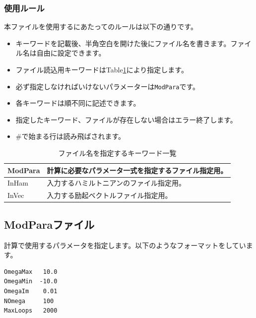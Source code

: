 \documentclass[12pt,titlepage]{jarticle}
\begin{document}
\subsubsection{使用ルール}
本ファイルを使用するにあたってのルールは以下の通りです。
\begin{itemize}
\item キーワードを記載後、半角空白を開けた後にファイル名を書きます。ファイル名は自由に設定できます。
\item ファイル読込用キーワードはTable\ref{Table:Defs}により指定します。
\item 必ず指定しなければいけないパラメーターは\verb|ModPara|です。
\item 各キーワードは順不同に記述できます。
\item 指定したキーワード、ファイルが存在しない場合はエラー終了します。
\item $\#$で始まる行は読み飛ばされます。
\end{itemize}

 \begin{table}[h!]
\begin{center}
  \begin{tabular}{ll|} \hline
           ModPara       &  計算に必要なパラメータ一式を指定するファイル指定用。        \\ \hline   
           InHam        &   入力するハミルトニアンのファイル指定用。          \\   
           InVec         &   入力する励起ベクトルファイル指定用。 \\   \hline
  \end{tabular}
\end{center}
\caption{ファイル名を指定するキーワード一覧}
\label{Table:Defs}
\end{table}%

\subsection{ModParaファイル}
\label{Subsec:modpara}
計算で使用するパラメータを指定します。以下のようなフォーマットをしています。\\
\begin{minipage}{10cm}
\begin{screen}
\begin{verbatim}
OmegaMax   10.0
OmegaMin  -10.0
OmegaIm    0.01
NOmega     100  
MaxLoops   2000
\end{verbatim}
\end{screen}
\end{minipage}
\end{document}
